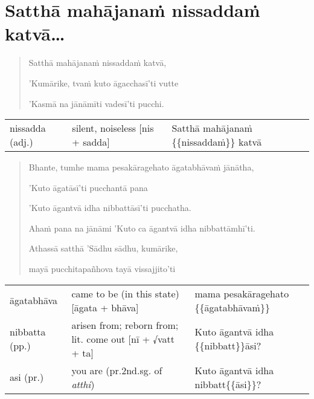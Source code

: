\documentclass[11pt,oneside]{memoir}
\begin{document}

\clearpage

\section{Satthā mahājanaṁ nissaddaṁ katvā\ldots{}}
\label{sec:org0567df4}

\begin{quote}
Satthā mahājanaṁ nissaddaṁ katvā,

'Kumārike, tvaṁ kuto āgacchasī'ti vutte

'Kasmā na jānāmīti vadesī'ti pucchi.
\end{quote}

\begin{longtable}{L{\colOne} L{\colTwo} H}
nissadda (adj.) & silent, noiseless [nis + sadda] & Satthā mahājanaṁ \{\{nissaddaṁ\}\} katvā\\[0pt]
\end{longtable}


\clearpage

\begin{quote}
Bhante, tumhe mama pesakāragehato āgatabhāvaṁ jānātha,

'Kuto āgatāsī'ti pucchantā pana

'Kuto āgantvā idha nibbattāsī'ti pucchatha.

Ahaṁ pana na jānāmi 'Kuto ca āgantvā idha nibbattāmhī'ti.

Athassā satthā 'Sādhu sādhu, kumārike,

mayā pucchitapañhova tayā vissajjito'ti
\end{quote}

\begin{longtable}{L{\colOne} L{\colTwo} H}
āgatabhāva & came to be (in this state) [āgata + bhāva] & mama pesakāragehato \{\{āgatabhāvaṁ\}\}\\[0pt]
nibbatta (pp.) & arisen from; reborn from; lit. come out [nī + √vatt + ta] & Kuto āgantvā idha \{\{nibbatt\}\}āsi?\\[0pt]
asi (pr.) & you are (pr.2nd.sg. of \emph{atthi}) & Kuto āgantvā idha nibbatt\{\{āsi\}\}?\\[0pt]
\end{longtable}


\clearpage
\end{document}

